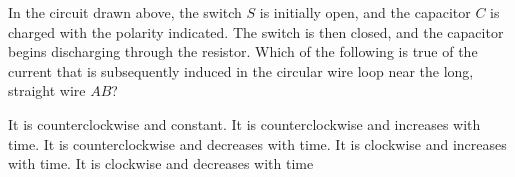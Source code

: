 \documentclass[12pt]{../oss-classkick-exam}
\begin{document}
\begin{questions}
\begin{oneparchoices}
    \choice

    \choice

    \choice
  \end{oneparchoices}
  \vspace{.3in}
  \newpage
  
  \question In the circuit drawn above, the switch $S$ is initially open, and
  the capacitor $C$ is charged with the polarity indicated. The switch is then
  closed, and the capacitor begins discharging through the resistor. Which of
  the following is true of the current that is subsequently induced in the
  circular wire loop near the long, straight wire $AB$?

  \begin{minipage}{.3\linewidth}
  \end{minipage}
  \begin{minipage}{.59\linewidth}
    \begin{choices}
      \choice It is counterclockwise and constant.
      \choice It is counterclockwise and increases with time.
      \choice It is counterclockwise and decreases with time.
      \choice It is clockwise and increases with time.
      \choice It is clockwise and decreases with time
    \end{choices}
  \end{minipage}
  \vspace{.3in}
  

\end{questions}
\end{document}

